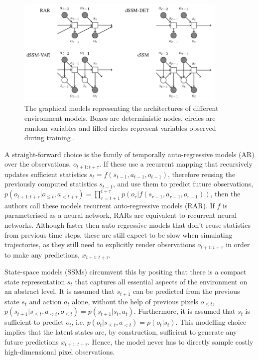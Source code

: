 \begin{figure}[H]
\includegraphics[width=0.9\textwidth,keepaspectratio]{figures/FastGenerativeModels.png}
\caption[Fast Generative Models]{The graphical models representing the architectures of different environment models. Boxes are deterministic nodes, circles are random variables and filled circles represent variables observed during training \protect\cite{Algo.FastGenerativeModels}.}
\label{Fig.FastGenerativeModels}
\end{figure}

A straight-forward choice is the family of temporally auto-regressive models (AR) over the observations, $o_{t+1:t+\tau}$. If these use a recurrent mapping that recursively updates sufficient statistics $s_t = f(s_{t−1}, a_{t−1}, o_{t−1})$, therefore reusing the previously computed statistics $s_{t-1}$, and use them to predict future observations, $p(o_{t+1:t+\tau} | o_{\leqslant t}, a_{<t+\tau}) = \prod^{t+\tau}_{r=t+1} p(o_r | f(s_{r−1}, a_{r−1}, o_{r−1}))$, then the authors call these models recurrent auto-regressive models (RAR). If $f$ is parameterised as a neural network, RARs are equivalent to recurrent neural networks. Although faster then auto-regressive models that don't reuse statistics from previous time steps, these are still expect to be slow when simulating trajectories, as they still need to explicitly render observations $o_{t+1:t+\tau}$ in order to make any predictions, $x_{t+1:t+\tau}$.

State-space models (SSMs) circumvent this by positing that there is a compact state representation $s_t$ that captures all essential aspects of the environment on an abstract level. It is assumed that $s_{t+1}$ can be predicted from the previous state $s_t$ and action $a_t$ alone, without the help of previous pixels $o_{\leqslant t}$, $p(s_{t+1}|s_{\leqslant t}, a_{<t}, o_{\leqslant t}) = p(s_{t+1}| s_t, a_t)$. Furthermore, it is assumed that $s_t$ is sufficient to predict $o_t$, i.e. $p(o_t|s_{\leqslant t}, a_{<t}) = p(o_t|s_t)$. This modelling choice implies that the latent states are, by construction, sufficient to generate any future predictions $x_{t+1:t+\tau}$. Hence, the model never has to directly sample costly high-dimensional pixel observations.

